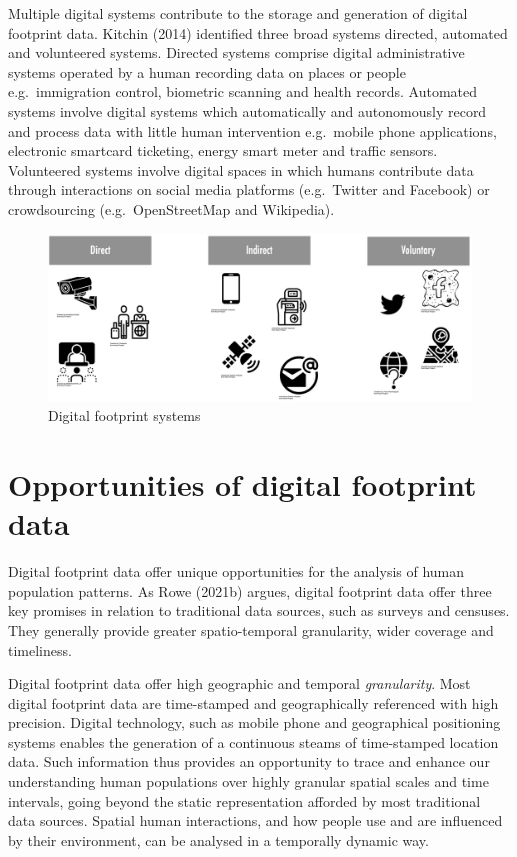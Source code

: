 \documentclass[
  letterpaper,
  DIV=11,
  numbers=noendperiod]{scrreprt}
\begin{document}
Multiple digital systems contribute to the storage and generation of
digital footprint data. Kitchin (2014) identified three broad systems
directed, automated and volunteered systems. Directed systems comprise
digital administrative systems operated by a human recording data on
places or people e.g.~immigration control, biometric scanning and health
records. Automated systems involve digital systems which automatically
and autonomously record and process data with little human intervention
e.g.~mobile phone applications, electronic smartcard ticketing, energy
smart meter and traffic sensors. Volunteered systems involve digital
spaces in which humans contribute data through interactions on social
media platforms (e.g.~Twitter and Facebook) or crowdsourcing
(e.g.~OpenStreetMap and Wikipedia).

\begin{figure}

{\centering \includegraphics{figs/chp2/fig2-systems.png}

}

\caption{Digital footprint systems}

\end{figure}

\hypertarget{opportunities-of-digital-footprint-data}{%
\section{Opportunities of digital footprint
data}\label{opportunities-of-digital-footprint-data}}

Digital footprint data offer unique opportunities for the analysis of
human population patterns. As Rowe (2021b) argues, digital footprint
data offer three key promises in relation to traditional data sources,
such as surveys and censuses. They generally provide greater
spatio-temporal granularity, wider coverage and timeliness.

Digital footprint data offer high geographic and temporal
\emph{granularity}. Most digital footprint data are time-stamped and
geographically referenced with high precision. Digital technology, such
as mobile phone and geographical positioning systems enables the
generation of a continuous steams of time-stamped location data. Such
information thus provides an opportunity to trace and enhance our
understanding human populations over highly granular spatial scales and
time intervals, going beyond the static representation afforded by most
traditional data sources. Spatial human interactions, and how people use
and are influenced by their environment, can be analysed in a temporally
dynamic way.
\end{document}
